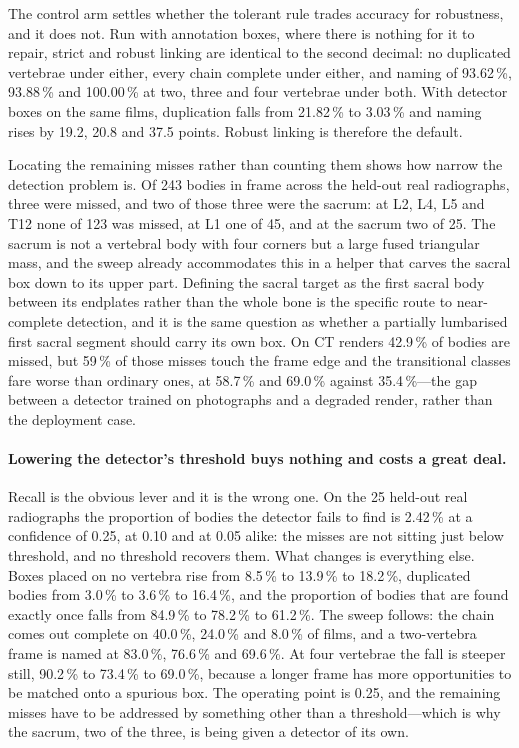 \documentclass[11pt,letterpaper]{article}
\begin{document}
The control arm settles whether the tolerant rule trades accuracy for robustness, and it does not. Run with annotation boxes, where there is nothing for it to repair, strict and robust linking are identical to the second decimal: no duplicated vertebrae under either, every chain complete under either, and naming of 93.62\,\%, 93.88\,\% and 100.00\,\% at two, three and four vertebrae under both. With detector boxes on the same films, duplication falls from 21.82\,\% to 3.03\,\% and naming rises by 19.2, 20.8 and 37.5 points. Robust linking is therefore the default.

Locating the remaining misses rather than counting them shows how narrow the detection problem is. Of 243 bodies in frame across the held-out real radiographs, three were missed, and two of those three were the sacrum: at L2, L4, L5 and T12 none of 123 was missed, at L1 one of 45, and at the sacrum two of 25. The sacrum is not a vertebral body with four corners but a large fused triangular mass, and the sweep already accommodates this in a helper that carves the sacral box down to its upper part. Defining the sacral target as the first sacral body between its endplates rather than the whole bone is the specific route to near-complete detection, and it is the same question as whether a partially lumbarised first sacral segment should carry its own box. On CT renders 42.9\,\% of bodies are missed, but 59\,\% of those misses touch the frame edge and the transitional classes fare worse than ordinary ones, at 58.7\,\% and 69.0\,\% against 35.4\,\%---the gap between a detector trained on photographs and a degraded render, rather than the deployment case.



\paragraph{Lowering the detector's threshold buys nothing and costs a great deal.} Recall is the obvious lever and it is the wrong one. On the 25 held-out real radiographs the proportion of bodies the detector fails to find is 2.42\,\% at a confidence of 0.25, at 0.10 and at 0.05 alike: the misses are not sitting just below threshold, and no threshold recovers them. What changes is everything else. Boxes placed on no vertebra rise from 8.5\,\% to 13.9\,\% to 18.2\,\%, duplicated bodies from 3.0\,\% to 3.6\,\% to 16.4\,\%, and the proportion of bodies that are found exactly once falls from 84.9\,\% to 78.2\,\% to 61.2\,\%. The sweep follows: the chain comes out complete on 40.0\,\%, 24.0\,\% and 8.0\,\% of films, and a two-vertebra frame is named at 83.0\,\%, 76.6\,\% and 69.6\,\%. At four vertebrae the fall is steeper still, 90.2\,\% to 73.4\,\% to 69.0\,\%, because a longer frame has more opportunities to be matched onto a spurious box. The operating point is 0.25, and the remaining misses have to be addressed by something other than a threshold---which is why the sacrum, two of the three, is being given a detector of its own.
\end{document}
